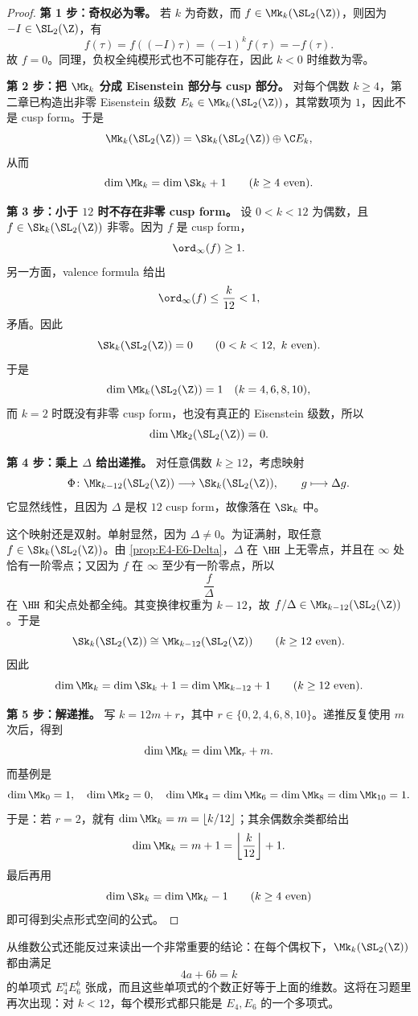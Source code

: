 \begin{proof}
\textbf{第 1 步：奇权必为零。}
若 $k$ 为奇数，而 $f\in \Mk_k(\SL_2(\Z))$，则因为 $-I\in\SL_2(\Z)$，有
\[
  f(\tau)=f((-I)\tau)=(-1)^k f(\tau)=-f(\tau).
\]
故 $f=0$。同理，负权全纯模形式也不可能存在，因此 $k<0$ 时维数为零。

\textbf{第 2 步：把 $\Mk_k$ 分成 Eisenstein 部分与 cusp 部分。}
对每个偶数 $k\ge 4$，第二章已构造出非零 Eisenstein 级数 $E_k\in \Mk_k(\SL_2(\Z))$，其常数项为 $1$，因此不是 cusp form。于是
\[
  \Mk_k(\SL_2(\Z))=\Sk_k(\SL_2(\Z))\oplus \C E_k,
\]
从而
\[
  \dim \Mk_k=\dim \Sk_k+1 \qquad (k\ge 4\text{ even}).
\]

\textbf{第 3 步：小于 $12$ 时不存在非零 cusp form。}
设 $0<k<12$ 为偶数，且 $f\in \Sk_k(\SL_2(\Z))$ 非零。因为 $f$ 是 cusp form，
\[
  \ord_\infty(f)\ge 1.
\]
另一方面，valence formula 给出
\[
  \ord_\infty(f)\le \frac{k}{12}<1,
\]
矛盾。因此
\[
  \Sk_k(\SL_2(\Z))=0 \qquad (0<k<12,\ k\text{ even}).
\]
于是
\[
  \dim \Mk_k(\SL_2(\Z))=1 \quad (k=4,6,8,10),
\]
而 $k=2$ 时既没有非零 cusp form，也没有真正的 Eisenstein 级数，所以
\[
  \dim \Mk_2(\SL_2(\Z))=0.
\]

\textbf{第 4 步：乘上 $\Delta$ 给出递推。}
对任意偶数 $k\ge 12$，考虑映射
\[
  \Phi\colon \Mk_{k-12}(\SL_2(\Z))\longrightarrow \Sk_k(\SL_2(\Z)),
  \qquad g\longmapsto \Delta g.
\]
它显然线性，且因为 $\Delta$ 是权 $12$ cusp form，故像落在 $\Sk_k$ 中。

这个映射还是双射。单射显然，因为 $\Delta\neq 0$。为证满射，取任意 $f\in \Sk_k(\SL_2(\Z))$。由 \cref{prop:E4-E6-Delta}，$\Delta$ 在 $\HH$ 上无零点，并且在 $\infty$ 处恰有一阶零点；又因为 $f$ 在 $\infty$ 至少有一阶零点，所以
\[
  \frac{f}{\Delta}
\]
在 $\HH$ 和尖点处都全纯。其变换律权重为 $k-12$，故 $f/\Delta\in \Mk_{k-12}(\SL_2(\Z))$。于是
\[
  \Sk_k(\SL_2(\Z))\cong \Mk_{k-12}(\SL_2(\Z))
  \qquad (k\ge 12\text{ even}).
\]
因此
\[
  \dim \Mk_k=\dim \Sk_k+1=\dim \Mk_{k-12}+1
  \qquad (k\ge 12\text{ even}).
\]

\textbf{第 5 步：解递推。}
写 $k=12m+r$，其中 $r\in\{0,2,4,6,8,10\}$。递推反复使用 $m$ 次后，得到
\[
  \dim \Mk_k=\dim \Mk_r+m.
\]
而基例是
\[
  \dim \Mk_0=1,\quad \dim \Mk_2=0,\quad
  \dim \Mk_4=\dim \Mk_6=\dim \Mk_8=\dim \Mk_{10}=1.
\]
于是：若 $r=2$，就有 $\dim \Mk_k=m=\lfloor k/12\rfloor$；其余偶数余类都给出
\[
  \dim \Mk_k=m+1=\left\lfloor\frac{k}{12}\right\rfloor+1.
\]
最后再用
\[
  \dim \Sk_k=\dim \Mk_k-1 \qquad (k\ge 4\text{ even})
\]
即可得到尖点形式空间的公式。
\end{proof}

\begin{remark}[与 $E_4,E_6$ 的关系]
从维数公式还能反过来读出一个非常重要的结论：在每个偶权下，$\Mk_k(\SL_2(\Z))$ 都由满足
\[
  4a+6b=k
\]
的单项式 $E_4^aE_6^b$ 张成，而且这些单项式的个数正好等于上面的维数。这将在习题里再次出现：对 $k<12$，每个模形式都只能是 $E_4,E_6$ 的一个多项式。
\end{remark}


